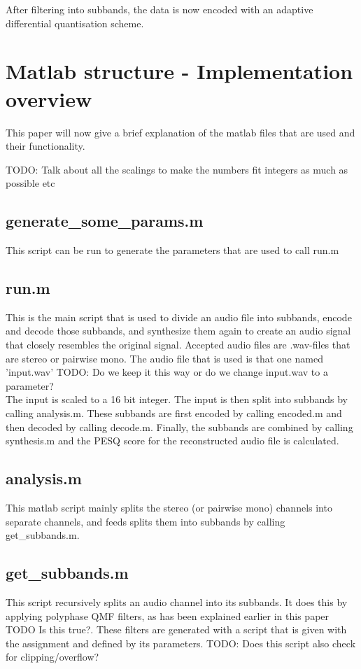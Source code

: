 \documentclass[a4paper]{article}
\begin{document}
After filtering into subbands, the data is now encoded with an adaptive differential quantisation scheme.

\begin{figure}

\end{figure}
\section{Matlab structure - Implementation overview}
This paper will now give a brief explanation of the matlab files that are used and their functionality.

TODO: Talk about all the scalings to make the numbers fit integers as much as possible etc

\subsection{generate\_some\_params.m}
This script can be run to generate the parameters that are used to call run.m

\subsection{run.m}
This is the main script that is used to divide an audio file into subbands, encode and decode those subbands, and synthesize them again to create an audio signal that closely resembles the original signal. Accepted audio files are .wav-files that are stereo or pairwise mono. The audio file that is used is that one named 'input.wav' TODO: Do we keep it this way or do we change input.wav to a parameter? 
\\
The input is scaled to a 16 bit integer. The input is then split into subbands by calling analysis.m. These subbands are first encoded by calling encoded.m and then decoded by calling decode.m. Finally, the subbands are combined by calling synthesis.m and the PESQ score for the reconstructed audio file is calculated.

\subsection{analysis.m}
This matlab script mainly splits the stereo (or pairwise mono) channels into separate channels, and feeds splits them into subbands by calling get\_subbands.m.

\subsection{get\_subbands.m}
This script recursively splits an audio channel into its subbands. It does this by applying polyphase QMF filters, as has been explained earlier in this paper TODO Is this true?. These filters are generated with a script that is given with the assignment and defined by its parameters.
TODO: Does this script also check for clipping/overflow?
\end{document}
